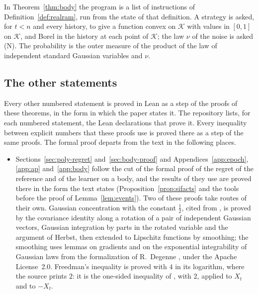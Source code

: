 \documentclass[11pt]{amsart}
\theoremstyle{definition}
\numberwithin{equation}{section}
\newcommand{\cK}{\mathcal{K}}
\begin{document}
In Theorem~\ref{thm:body} the program is a list of instructions of Definition~\ref{def:realram}, run from the state of that definition. A strategy is asked, for $t<n$ and every history, to give a function convex on $\cK$ with values in $[0,1]$ on $\cK$, and Borel in the history at each point of $\cK$; the law $\nu$ of the noise is asked (N). The probability is the outer measure of the product of the law of independent standard Gaussian variables and $\nu$.

\subsection{The other statements}\label{sec:formal-proved}
Every other numbered statement is proved in Lean as a step of the proofs of these theorems, in the form in which the paper states it. The repository lists, for each numbered statement, the Lean declarations that prove it. Every inequality between explicit numbers that these proofs use is proved there as a step of the same proofs. The formal proof departs from the text in the following places.
\begin{itemize}
\item Sections~\ref{sec:poly-regret} and~\ref{sec:body-proof} and Appendices~\ref{app:epoch}, \ref{app:ap} and~\ref{app:body} follow the cut of the formal proof of the regret of the reference and of the learner on a body, and the results of \cite{Lat24} they use are proved there in the form the text states (Proposition~\ref{prop:sifacts} and the tools before the proof of Lemma~\ref{lem:events}). Two of these proofs take routes of their own. Gaussian concentration with the constant $\frac12$, cited from \cite{TIS76}, is proved by the covariance identity along a rotation of a pair of independent Gaussian vectors, Gaussian integration by parts in the rotated variable and the argument of Herbst, then extended to Lipschitz functions by smoothing; the smoothing uses lemmas on gradients and on the exponential integrability of Gaussian laws from the formalization of R.~Degenne \cite{Maiti2026Power}, under the Apache License~2.0. Freedman's inequality \cite[Theorem~B.20]{Lat24} is proved with $4$ in its logarithm, where the source prints $2$: it is the one-sided inequality of \cite[Theorem~9]{ZL22}, with $2$, applied to $X_t$ and to $-X_t$.
\end{itemize}
\end{document}
